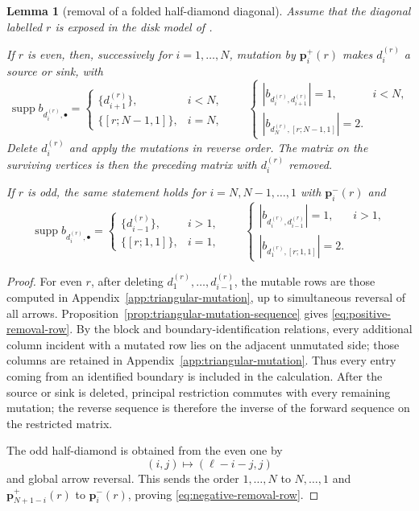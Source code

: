 \documentclass[11pt]{amsart}
\newtheorem{lemma}[theorem]{Lemma}
\theoremstyle{definition}
\theoremstyle{remark}
\begin{document}
\begin{lemma}[removal of a folded half-diamond diagonal]
\label{lem:folded-half-diamond-removal}
Assume that the diagonal labelled $r$ is exposed in the disk model of \cite{FeiKroneckerII}.

If $r$ is even, then, successively for $i=1,\ldots,N$, mutation by
$\mathbf p_i^+(r)$ makes $d_i^{(r)}$ a source or sink, with
\begin{equation}
 \operatorname{supp}b_{d_i^{(r)},\bullet}=
 \begin{cases}
  \{d_{i+1}^{(r)}\},&i<N,\\
  \{[r;N-1,1]\},&i=N,
 \end{cases}
 \qquad
 \begin{cases}
  |b_{d_i^{(r)},d_{i+1}^{(r)}}|=1,&i<N,\\
  |b_{d_N^{(r)},[r;N-1,1]}|=2.&
 \end{cases}
 \label{eq:positive-removal-row}
\end{equation}
Delete $d_i^{(r)}$ and apply the mutations in reverse order.  The matrix on
the surviving vertices is then the preceding matrix with $d_i^{(r)}$ removed.

If $r$ is odd, the same statement holds for $i=N,N-1,\ldots,1$ with
$\mathbf p_i^-(r)$ and
\begin{equation}
 \operatorname{supp}b_{d_i^{(r)},\bullet}=
 \begin{cases}
  \{d_{i-1}^{(r)}\},&i>1,\\
  \{[r;1,1]\},&i=1,
 \end{cases}
 \qquad
 \begin{cases}
  |b_{d_i^{(r)},d_{i-1}^{(r)}}|=1,&i>1,\\
  |b_{d_1^{(r)},[r;1,1]}|=2.&
 \end{cases}
 \label{eq:negative-removal-row}
\end{equation}
\end{lemma}

\begin{proof}
For even $r$, after deleting
$d_1^{(r)},\ldots,d_{i-1}^{(r)}$, the mutable rows are those computed in
Appendix~\ref{app:triangular-mutation}, up to simultaneous reversal of
all arrows.  Proposition~\ref{prop:triangular-mutation-sequence} gives
\eqref{eq:positive-removal-row}.  By the block and boundary-identification
relations, every additional column incident with a mutated row lies on the
adjacent unmutated side; those
columns are retained in Appendix~\ref{app:triangular-mutation}.  Thus every
entry coming from an identified boundary is included in the calculation.
After the source or sink is deleted, principal restriction commutes with every
remaining mutation; the reverse sequence is therefore the inverse of the
forward sequence on the restricted matrix.

The odd half-diamond is obtained from the even one by
\[ (i,j)\longmapsto(\ell-i-j,j) \]
and global arrow reversal.  This sends the order $1,\ldots,N$ to
$N,\ldots,1$ and $\mathbf p_{N+1-i}^+(r)$ to $\mathbf p_i^-(r)$, proving
\eqref{eq:negative-removal-row}.
\end{proof}
\end{document}
